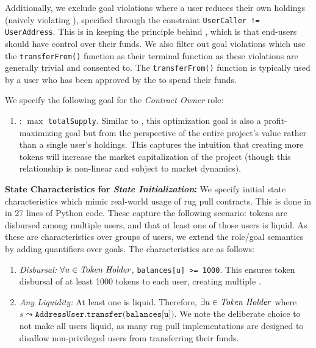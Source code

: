 Additionally, we exclude goal violations where a user reduces their own holdings (naively violating \maxowned{}), specified through the constraint \texttt{UserCaller != UserAddress}.
This is in keeping the principle behind \liquidity{}, which is that end-users should have control over their funds.
We also filter out \maxowned goal violations which use the \texttt{transferFrom()} function as their terminal function as these violations are generally trivial and consented to.
The \texttt{transferFrom()} function is typically used by a user who has been approved by the \holder to spend their funds.

We specify the following goal for the \textit{Contract Owner} role:
\begin{enumerate}
    \item \textit{\rev{\maxsupply}}: $\max$ \texttt{totalSupply}.
        Similar to \minsupply{}, this optimization goal is also a profit-maximizing goal but from the perspective of the entire project's value rather than a single user's holdings.
        This captures the intuition that creating more tokens will increase the market capitalization of the project (though this relationship is non-linear and subject to market dynamics).
\end{enumerate}



\textbf{State Characteristics for \textit{State Initialization}:}
We specify initial state characteristics which mimic real-world usage of rug pull contracts.
This is done in in 27 lines of Python code.
These capture the following scenario: tokens are disbursed among multiple users, and that at least one of those users is liquid.
As these are characteristics over groups of users, we extend the role/goal semantics by adding quantifiers over goals.
The characteristics are as follows:
\begin{enumerate}
    \item \textit{Disbursal:}
        $\forall u \in \text{\textit{Token Holder}}$, \texttt{balances[u] >= 1000}.
        This ensures token disbursal of at least 1000 tokens to each user, creating multiple \holder{}.
    \item \textit{Any Liquidity:}  At least one \holder is liquid. Therefore, 
    $\exists u \in \text{\textit{Token Holder}}$ where $s \leadsto\texttt{AddressUser.transfer(balances[u])}$.
       We note the deliberate choice to not make all users liquid, as many rug pull implementations are designed to disallow non-privileged users from transferring their funds.
\end{enumerate}

